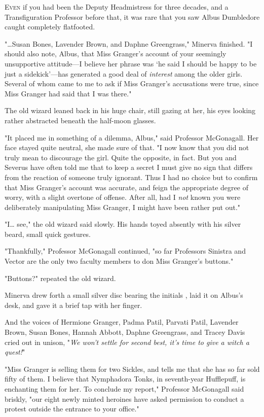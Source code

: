 
\lettrine{E}{ven} if you had
been the Deputy Headmistress for three decades, and a Transfiguration Professor
before that, it was rare that you saw Albus Dumbledore caught completely
flatfooted.

"{\ldots}Susan Bones, Lavender Brown, and Daphne Greengrass," Minerva finished.
"I should also note, Albus, that Miss Granger's account of your seemingly
unsupportive attitude---I believe her phrase was `he said I should be happy to
be just a sidekick'---has generated a good deal of \emph{interest} among the
older girls. Several of whom came to me to ask if Miss Granger's accusations
were true, since Miss Granger had said that I was there."

The old wizard leaned back in his huge chair, still gazing at her, his eyes
looking rather abstracted beneath the half-moon glasses.

"It placed me in something of a dilemma, Albus," said Professor McGonagall. Her
face stayed quite neutral, she made sure of that. "I now know that you did not
truly mean to discourage the girl. Quite the opposite, in fact. But you and
Severus have often told me that to keep a secret I must give no sign that
differs from the reaction of someone truly ignorant. Thus I had no choice but
to confirm that Miss Granger's account was accurate, and feign the appropriate
degree of worry, with a slight overtone of offense. After all, had I \emph{not}
known you were deliberately manipulating Miss Granger, I might have been rather
put out."

"I{\ldots} see," the old wizard said slowly. His hands toyed absently with his
silver beard, small quick gestures.

"Thankfully," Professor McGonagall continued, "so far Professors Sinistra and
Vector are the only two faculty members to don Miss Granger's buttons."

"Buttons?" repeated the old wizard.

Minerva drew forth a small silver disc bearing the initials \SPHEW, laid it
on Albus's desk, and gave it a brief tap with her finger.

And the voices of Hermione Granger, Padma Patil, Parvati Patil, Lavender Brown,
Susan Bones, Hannah Abbott, Daphne Greengrass, and Tracey Davis cried out in
unison, "\emph{We won't settle for second best, it's time to give a witch a
quest!}"

"Miss Granger is selling them for two Sickles, and tells me that she has so far
sold fifty of them. I believe that Nymphadora Tonks, in seventh-year
Hufflepuff, is enchanting them for her. To conclude my report," Professor
McGonagall said briskly, "our eight newly minted heroines have asked permission
to conduct a protest outside the entrance to your office."

